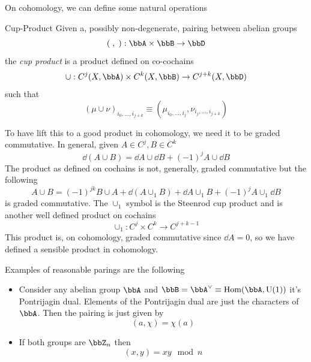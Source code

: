 On cohomology, we can define some natural operations
\begin{defn}{Cup-Product}{}
	Given a, possibly non-degenerate, pairing between abelian groups
	\begin{equation}
		(\;,\;):\bbA\times \bbB \rightarrow \bbD
	\end{equation}
	the \textit{cup product} is a product defined on co-cochains
	\begin{equation}
		\cup:C^j(X,\bbA)\times C^k(X,\bbB)\rightarrow C^{j+k}(X,\bbD)
	\end{equation}
	such that
	\begin{equation}
		(\mu \cup \nu)_{i_0,\ldots,i_{j+k}}\equiv (\mu_{i_0,\ldots, i_j},\nu_{i_j,\ldots, i_{j+k}})
	\end{equation}
\end{defn}
To have lift this to a good product in cohomology, we need it to be graded commutative. In general, given $A\in C^j, B\in C^k$
\begin{equation}
	\dd(A\cup B)=\dd{A}\cup \dd{B}+(-1)^j A\cup\dd{B}
\end{equation}
The product as defined on cochains is not, generally, graded commutative but the following
\begin{equation}
	A\cup B=(-1)^{jk}B\cup A+\dd{(A\cup_1 B)}+\dd{A}\cup_1 B+(-1)^j A\cup_1\dd{B}
\end{equation}
is graded commutative. The $\cup_1$ symbol is the Steenrod cup product and is another well defined product on cochains
\begin{equation}
	\cup_1:C^j\times C^k\rightarrow C^{j+k-1}
\end{equation}
This product is, on cohomology, graded commutative since $\dd{A}=0$, so we have defined a sensible product in cohomology.

Examples of reasonable parings are the following
\begin{itemize}
	\item Consider any abelian group $\bbA$ and $\bbB=\bbA^\vee\equiv \Hom(\bbA,\U(1))$ it's Pontrijagin dual. Elements of the Pontrijagin dual are just the characters of $\bbA$. Then the pairing is just given by
	\begin{equation}
		(a,\chi)=\chi(a)
	\end{equation}
	\item If both groups are $\bbZ_n$ then
	\begin{equation}
		(x,y)=xy\mod n
	\end{equation}
\end{itemize}
